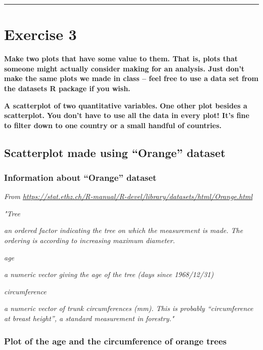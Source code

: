 \documentclass[]{article}
\begin{document}
\begin{center}\rule{0.5\linewidth}{\linethickness}\end{center}

\hypertarget{exercise-3}{%
\section{Exercise 3}\label{exercise-3}}

\textbf{Make two plots that have some value to them. That is, plots that
someone might actually consider making for an analysis. Just don't make
the same plots we made in class -- feel free to use a data set from the
datasets R package if you wish.}

\textbf{A scatterplot of two quantitative variables.} \textbf{One other
plot besides a scatterplot.} \textbf{You don't have to use all the data
in every plot! It's fine to filter down to one country or a small
handful of countries.}

\hypertarget{scatterplot-made-using-orange-dataset}{%
\subsection{Scatterplot made using ``Orange''
dataset}\label{scatterplot-made-using-orange-dataset}}

\hypertarget{information-about-orange-dataset}{%
\subsubsection{Information about ``Orange''
dataset}\label{information-about-orange-dataset}}

\emph{From
\url{https://stat.ethz.ch/R-manual/R-devel/library/datasets/html/Orange.html}}

\emph{"Tree}

\emph{an ordered factor indicating the tree on which the measurement is
made. The ordering is according to increasing maximum diameter.}

\emph{age}

\emph{a numeric vector giving the age of the tree (days since
1968/12/31)}

\emph{circumference}

\emph{a numeric vector of trunk circumferences (mm). This is probably
``circumference at breast height'', a standard measurement in
forestry."}

\hypertarget{plot-of-the-age-and-the-circumference-of-orange-trees}{%
\subsubsection{Plot of the age and the circumference of orange
trees}\label{plot-of-the-age-and-the-circumference-of-orange-trees}}
\end{document}
